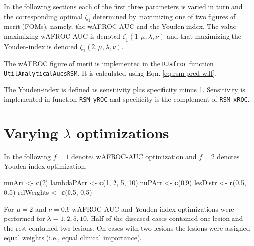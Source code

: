 \documentclass[
]{book}
\newenvironment{Shaded}{\begin{snugshade}}{\end{snugshade}}
\newcommand{\DecValTok}[1]{\textcolor[rgb]{0.00,0.00,0.81}{#1}}
\newcommand{\FloatTok}[1]{\textcolor[rgb]{0.00,0.00,0.81}{#1}}
\newcommand{\KeywordTok}[1]{\textcolor[rgb]{0.13,0.29,0.53}{\textbf{#1}}}
\newcommand{\NormalTok}[1]{#1}
\newcommand{\StringTok}[1]{\textcolor[rgb]{0.31,0.60,0.02}{#1}}
\begin{document}
In the following sections each of the first three parameters is varied in turn and the corresponding optimal \(\zeta_1\) determined by maximizing one of two figures of merit (FOMs), namely, the wAFROC-AUC and the Youden-index. The value maximizing wAFROC-AUC is denoted \(\zeta_{1} \left ( 1, \mu, \lambda, \nu \right )\) and that maximizing the Youden-index is denoted \(\zeta_{1} \left ( 2, \mu, \lambda, \nu \right )\).

The wAFROC figure of merit is implemented in the \texttt{RJafroc} function \texttt{UtilAnalyticalAucsRSM}. It is calculated using Eqn. \eqref{eq:rsm-pred-wllf}.

The Youden-index is defined as sensitivity plus specificity minus 1. Sensitivity is implemented in function \texttt{RSM\_yROC} and specificity is the complement of \texttt{RSM\_xROC}.

\hypertarget{optim-op-point-vary-lambda}{%
\section{\texorpdfstring{Varying \(\lambda\) optimizations}{Varying \textbackslash lambda optimizations}}\label{optim-op-point-vary-lambda}}

In the following \(f = 1\) denotes wAFROC-AUC optimization and \(f = 2\) denotes Youden-index optimization.

\begin{Shaded}
\begin{Highlighting}[]
\NormalTok{muArr <-}\StringTok{ }\KeywordTok{c}\NormalTok{(}\DecValTok{2}\NormalTok{)}
\NormalTok{lambdaPArr <-}\StringTok{ }\KeywordTok{c}\NormalTok{(}\DecValTok{1}\NormalTok{, }\DecValTok{2}\NormalTok{, }\DecValTok{5}\NormalTok{, }\DecValTok{10}\NormalTok{)}
\NormalTok{nuPArr <-}\StringTok{ }\KeywordTok{c}\NormalTok{(}\FloatTok{0.9}\NormalTok{)}
\NormalTok{lesDistr <-}\StringTok{ }\KeywordTok{c}\NormalTok{(}\FloatTok{0.5}\NormalTok{, }\FloatTok{0.5}\NormalTok{)}
\NormalTok{relWeights <-}\StringTok{ }\KeywordTok{c}\NormalTok{(}\FloatTok{0.5}\NormalTok{, }\FloatTok{0.5}\NormalTok{)}
\end{Highlighting}
\end{Shaded}

For \(\mu = 2\) and \(\nu = 0.9\) wAFROC-AUC and Youden-index optimizations were performed for \(\lambda = 1, 2, 5, 10\). Half of the diseased cases contained one lesion and the rest contained two lesions. On cases with two lesions the lesions were assigned equal weights (i.e., equal clinical importance).
\end{document}
